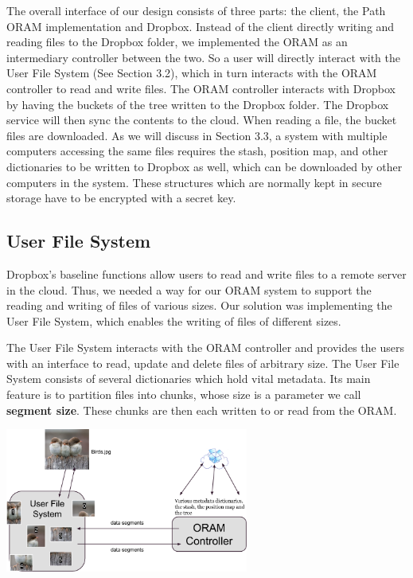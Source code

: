 \documentclass[conference]{IEEEtran}
\begin{document}
The overall interface of our design consists of three parts: the client, the Path ORAM implementation and Dropbox. Instead of the client directly writing and reading files to the Dropbox folder, we implemented the ORAM as an intermediary controller between the two. So a user will directly interact with the User File System (See Section 3.2), which in turn interacts with the ORAM controller to read and write files. The ORAM controller interacts with Dropbox by having the buckets of the tree written to the Dropbox folder. The Dropbox service will then sync the contents to the cloud. When reading a file, the bucket files are downloaded. As we will discuss in Section 3.3, a system with multiple computers accessing the same files requires the stash, position map, and other dictionaries to be written to Dropbox as well, which can be downloaded by other computers in the system. These structures which are normally kept in secure storage have to be encrypted with a secret key.

\subsection{User File System}

Dropbox's baseline functions allow users to read and write files to a remote server in the cloud. Thus, we needed a way for our ORAM system to support the reading and writing of files of various sizes. Our solution was implementing the User File System, which enables the writing of files of different sizes. 

The User File System interacts with the ORAM controller and provides the users with an interface to read, update and delete files of arbitrary size. The User File System consists of several dictionaries which hold vital metadata. Its main feature is to partition files into chunks, whose size is a parameter we call {\bf segment size}. These chunks are then each written to or read from the ORAM.

\begin{center}
\noindent\includegraphics[width=8cm]{320.png}
\end{center}
\end{document}
